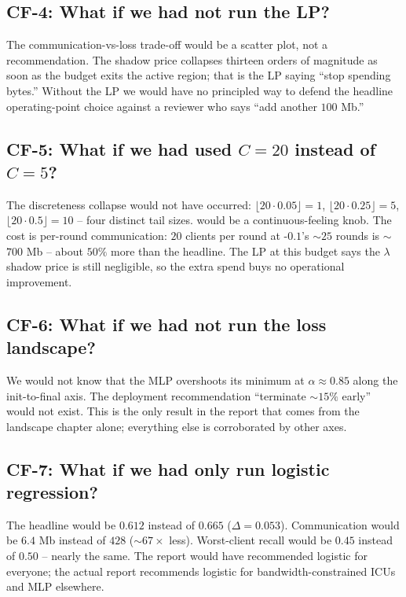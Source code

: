 \subsection{CF-4: What if we had not run the LP?}
The communication-vs-loss trade-off would be a scatter plot, not a
recommendation. The shadow price collapses thirteen orders of
magnitude as soon as the budget exits the active region; that is
the LP saying ``stop spending bytes.'' Without the LP we would have
no principled way to defend the headline operating-point choice
against a reviewer who says ``add another $100$ Mb.''

\subsection{CF-5: What if we had used $C\!=\!20$ instead of $C\!=\!5$?}
The \cvar{} discreteness collapse would not have occurred:
$\lfloor 20 \cdot 0.05 \rfloor \!=\! 1$, $\lfloor 20 \cdot 0.25
\rfloor \!=\! 5$, $\lfloor 20 \cdot 0.5 \rfloor \!=\! 10$ -- four
distinct tail sizes. \cvar{} would be a continuous-feeling knob.
The cost is per-round communication: $20$ clients per round at
\fedprox{}-$0.1$'s $\sim$$25$ rounds is $\sim$$700$ Mb -- about
$50\%$ more than the headline. The LP at this budget says the
$\lambda$ shadow price is still negligible, so the extra spend buys
no operational improvement.

\subsection{CF-6: What if we had not run the loss landscape?}
We would not know that the MLP overshoots its minimum at
$\alpha\!\approx\!0.85$ along the init-to-final axis. The deployment
recommendation ``terminate $\sim$$15\%$ early'' would not exist.
This is the only result in the report that comes from the landscape
chapter alone; everything else is corroborated by other axes.

\subsection{CF-7: What if we had only run logistic regression?}
The headline \auprc{} would be $0.612$ instead of $0.665$
($\Delta\!=\!0.053$). Communication would be $6.4$ Mb instead of
$428$ ($\sim$$67\!\times$ less). Worst-client recall would be
$0.45$ instead of $0.50$ -- nearly the same. The report would have
recommended logistic for everyone; the actual report recommends
logistic for bandwidth-constrained ICUs and MLP elsewhere.

